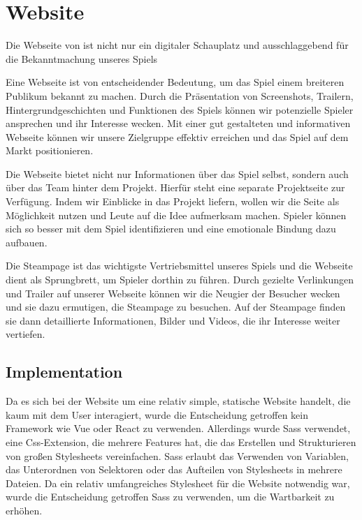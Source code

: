 
\section{Website}\label{sec:website}
\renewcommand{\kapitelautor}{Autor: Nils Hubmann}

%
Die Webseite von \ff ist nicht nur ein digitaler Schauplatz und ausschlaggebend für die Bekanntmachung unseres Spiels

Eine Webseite ist von entscheidender Bedeutung, um das Spiel einem breiteren Publikum bekannt zu machen.
Durch die Präsentation von Screenshots, Trailern, Hintergrundgeschichten und Funktionen des Spiels können wir potenzielle Spieler ansprechen und ihr Interesse wecken.
Mit einer gut gestalteten und informativen Webseite können wir unsere Zielgruppe effektiv erreichen und das Spiel auf dem Markt positionieren.

Die Webseite bietet nicht nur Informationen über das Spiel selbst, sondern auch über das Team hinter dem Projekt.
Hierfür steht eine separate Projektseite zur Verfügung.
Indem wir Einblicke in das Projekt liefern, wollen wir die Seite als Möglichkeit nutzen und Leute auf die Idee aufmerksam machen.
Spieler können sich so besser mit dem Spiel identifizieren und eine emotionale Bindung dazu aufbauen.

Die Steampage ist das wichtigste Vertriebsmittel unseres Spiels und die Webseite dient als Sprungbrett, um Spieler dorthin zu führen.
Durch gezielte Verlinkungen und Trailer auf unserer Webseite
können wir die Neugier der Besucher wecken und sie dazu ermutigen, die Steampage zu besuchen.
Auf der Steampage finden sie dann detaillierte Informationen, Bilder und Videos, die ihr Interesse weiter vertiefen.
%

\vfill
\pagebreak

\subsection{Implementation}
\renewcommand{\kapitelautor}{Autor: Marvin Kurka}

Da es sich bei der Website um eine relativ simple, statische Website handelt, die kaum mit dem User interagiert,
wurde die Entscheidung getroffen kein Framework wie \zB Vue oder React zu verwenden.
Allerdings wurde Sass verwendet, eine Css-Extension, die mehrere Features hat, die das Erstellen und Strukturieren
von großen Stylesheets vereinfachen.
Sass erlaubt \zB das Verwenden von Variablen, das Unterordnen von Selektoren oder das Aufteilen von
Stylesheets in mehrere Dateien.
Da ein relativ umfangreiches Stylesheet für die Website notwendig war, wurde die Entscheidung getroffen Sass zu
verwenden, um die Wartbarkeit zu erhöhen.

